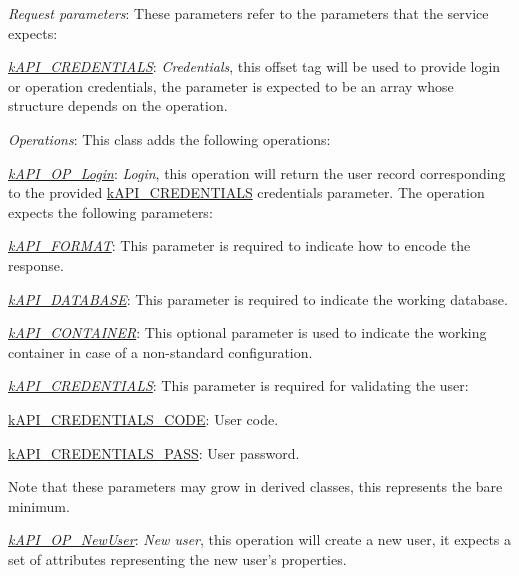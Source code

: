 {\itshape 
\begin{DoxyItemize}
\item {\itshape Request parameters}\-: These parameters refer to the parameters that the service expects\-: 
\begin{DoxyItemize}
\item {\itshape \hyperlink{}{k\-A\-P\-I\-\_\-\-C\-R\-E\-D\-E\-N\-T\-I\-A\-L\-S}}\-: {\itshape Credentials}, this offset tag will be used to provide login or operation credentials, the parameter is expected to be an array whose structure depends on the operation. 
\end{DoxyItemize}
\item {\itshape Operations}\-: This class adds the following operations\-: 
\begin{DoxyItemize}
\item {\itshape \hyperlink{}{k\-A\-P\-I\-\_\-\-O\-P\-\_\-\-Login}}\-: {\itshape Login}, this operation will return the user record corresponding to the provided \hyperlink{}{k\-A\-P\-I\-\_\-\-C\-R\-E\-D\-E\-N\-T\-I\-A\-L\-S} credentials parameter. The operation expects the following parameters\-: 
\begin{DoxyItemize}
\item {\itshape \hyperlink{}{k\-A\-P\-I\-\_\-\-F\-O\-R\-M\-A\-T}}\-: This parameter is required to indicate how to encode the response. 
\item {\itshape \hyperlink{}{k\-A\-P\-I\-\_\-\-D\-A\-T\-A\-B\-A\-S\-E}}\-: This parameter is required to indicate the working database. 
\item {\itshape \hyperlink{}{k\-A\-P\-I\-\_\-\-C\-O\-N\-T\-A\-I\-N\-E\-R}}\-: This optional parameter is used to indicate the working container in case of a non-\/standard configuration. 
\item {\itshape \hyperlink{}{k\-A\-P\-I\-\_\-\-C\-R\-E\-D\-E\-N\-T\-I\-A\-L\-S}}\-: This parameter is required for validating the user\-: 
\begin{DoxyItemize}
\item {\ttfamily \hyperlink{}{k\-A\-P\-I\-\_\-\-C\-R\-E\-D\-E\-N\-T\-I\-A\-L\-S\-\_\-\-C\-O\-D\-E}}\-: User code. 
\item {\ttfamily \hyperlink{}{k\-A\-P\-I\-\_\-\-C\-R\-E\-D\-E\-N\-T\-I\-A\-L\-S\-\_\-\-P\-A\-S\-S}}\-: User password. 
\end{DoxyItemize}Note that these parameters may grow in derived classes, this represents the bare minimum. 
\end{DoxyItemize}
\item {\itshape \hyperlink{}{k\-A\-P\-I\-\_\-\-O\-P\-\_\-\-New\-User}}\-: {\itshape New user}, this operation will create a new user, it expects a set of attributes representing the new user's properties. 

\end{DoxyItemize}
\end{DoxyItemize}}
